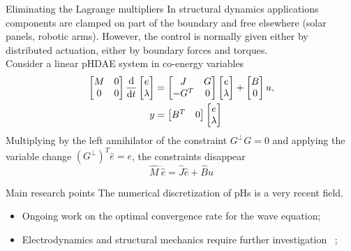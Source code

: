 \documentclass[aspectratio=169]{ISAE-Beamer}
\begin{document}
\begin{frame}{Eliminating the Lagrange multipliers}
In structural dynamics applications  components are clamped on part of the boundary and free elsewhere (solar panels, robotic arms). However, the control is normally given either by distributed actuation, either by boundary forces and torques. \\

Consider a linear pHDAE system in co-energy variables
\begin{align*}
\begin{bmatrix}
M & 0 \\
0 & 0 \\
\end{bmatrix}\diff{}{t}
\begin{bmatrix}
e \\ \lambda\\
\end{bmatrix} &= 
\begin{bmatrix}
J & G \\
-G^T & 0 \\
\end{bmatrix}
\begin{bmatrix}
e \\ \lambda \\
\end{bmatrix}
+ \begin{bmatrix}
B  \\ 0 \\
\end{bmatrix}u, \\
y &= \begin{bmatrix}
B^T & 0 \\
\end{bmatrix} \begin{bmatrix}
e \\ \lambda\\
\end{bmatrix}
\end{align*}
Multiplying by the left annihilator of the constraint $G^\perp G = 0$ and applying the variable change $(G^\perp)^T \widehat{e} = e$, the constraints disappear
\begin{equation*}
\widehat{M} \ \dot{\widehat{e}} = \widehat{J} \widehat{e} + \widehat{B} u 
\end{equation*}

\end{frame}

\begin{frame}{Main research points}
	The numerical discretization of pHs is a very recent field. 
	\begin{itemize}
		\item Ongoing work on the optimal convergence rate for the wave equation;
		\item Electrodynamics and structural mechanics require further investigation \, ;  
	\end{itemize}
\end{frame}
\end{document}
